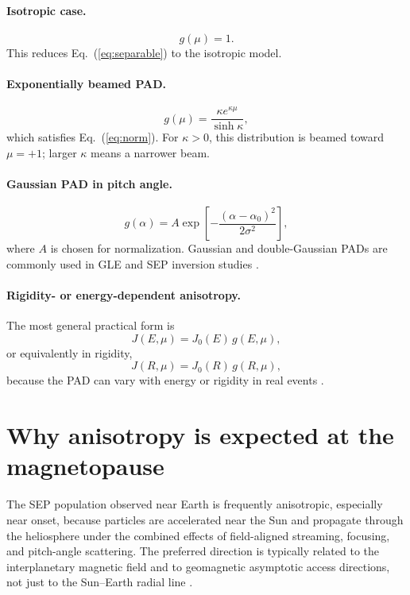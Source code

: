 \documentclass[11pt]{article}
\begin{document}
\paragraph{Isotropic case.}
\begin{equation}
g(\mu)=1.
\end{equation}
This reduces Eq.~(\ref{eq:separable}) to the isotropic model.

\paragraph{Exponentially beamed PAD.}
\begin{equation}
g(\mu)=\frac{\kappa e^{\kappa\mu}}{\sinh\kappa},
\end{equation}
which satisfies Eq.~(\ref{eq:norm}). For $\kappa>0$, this distribution is beamed toward $\mu=+1$; larger $\kappa$ means a narrower beam.

\paragraph{Gaussian PAD in pitch angle.}
\begin{equation}
g(\alpha) = A\exp\left[-\frac{(\alpha-\alpha_0)^2}{2\sigma^2}\right],
\end{equation}
where $A$ is chosen for normalization. Gaussian and double-Gaussian PADs are commonly used in GLE and SEP inversion studies \cite{Mishev2021,Davis2024}.

\paragraph{Rigidity- or energy-dependent anisotropy.}
The most general practical form is
\begin{equation}
J(E,\mu)=J_0(E)\,g(E,\mu),
\end{equation}
or equivalently in rigidity,
\begin{equation}
J(R,\mu)=J_0(R)\,g(R,\mu),
\end{equation}
because the PAD can vary with energy or rigidity in real events \cite{Davis2024}.

\section{Why anisotropy is expected at the magnetopause}
The SEP population observed near Earth is frequently anisotropic, especially near onset, because particles are accelerated near the Sun and propagate through the heliosphere under the combined effects of field-aligned streaming, focusing, and pitch-angle scattering. The preferred direction is typically related to the interplanetary magnetic field and to geomagnetic asymptotic access directions, not just to the Sun--Earth radial line \cite{Desai2016,Larsen2023}.
\end{document}
